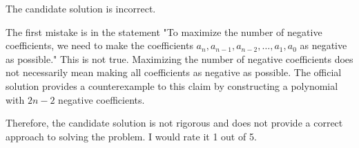 The candidate solution is incorrect.

The first mistake is in the statement "To maximize the number of negative coefficients, we need to make the coefficients \( a_n, a_{n-1}, a_{n-2}, \ldots, a_1, a_0 \) as negative as possible." This is not true. Maximizing the number of negative coefficients does not necessarily mean making all coefficients as negative as possible. The official solution provides a counterexample to this claim by constructing a polynomial with $2n-2$ negative coefficients.

Therefore, the candidate solution is not rigorous and does not provide a correct approach to solving the problem. I would rate it 1 out of 5.
